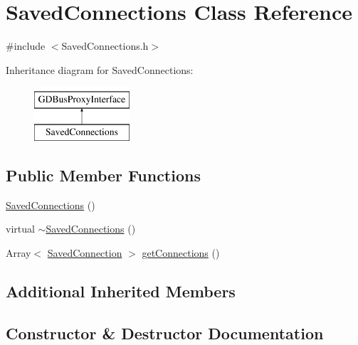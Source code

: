 \hypertarget{classSavedConnections}{}\section{Saved\+Connections Class Reference}
\label{classSavedConnections}


{\ttfamily \#include $<$Saved\+Connections.\+h$>$}

Inheritance diagram for Saved\+Connections\+:\begin{figure}[H]
\begin{center}
\leavevmode
\includegraphics[height=2.000000cm]{classSavedConnections}
\end{center}
\end{figure}
\subsection*{Public Member Functions}
\begin{DoxyCompactItemize}
\item 
\mbox{\hyperlink{classSavedConnections_a48785d2c83b358e3cd7b9921b12783a9}{Saved\+Connections}} ()
\item 
virtual \mbox{\hyperlink{classSavedConnections_ad04722b1171afd51c5a375cc5f952317}{$\sim$\+Saved\+Connections}} ()
\item 
Array$<$ \mbox{\hyperlink{classSavedConnection}{Saved\+Connection}} $>$ \mbox{\hyperlink{classSavedConnections_acb9764f074a04de74aaa1ef4bbf379a0}{get\+Connections}} ()
\end{DoxyCompactItemize}
\subsection*{Additional Inherited Members}


\subsection{Constructor \& Destructor Documentation}
\mbox{\label{classSavedConnections_a48785d2c83b358e3cd7b9921b12783a9}} 
